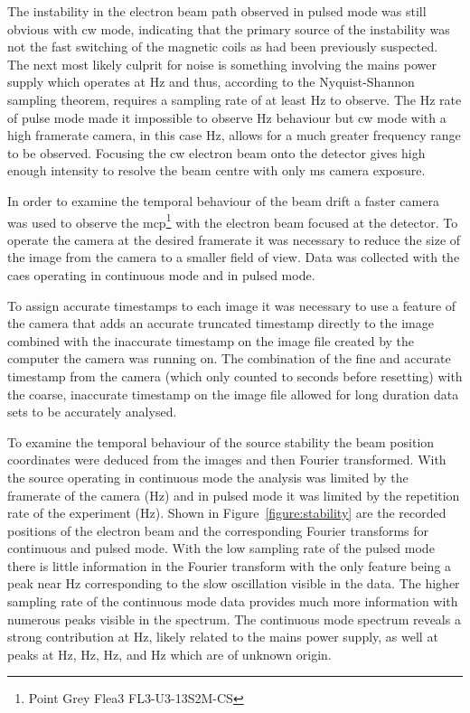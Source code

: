 The instability in the electron beam path observed in pulsed mode was still obvious with \gls{cw} mode, indicating that the primary source of the instability was not the fast switching of the magnetic coils as had been previously suspected.
The next most likely culprit for noise is something involving the mains power supply which operates at \unit[50]{Hz} and thus, according to the Nyquist-Shannon sampling theorem, requires a sampling rate of at least \unit[100]{Hz} to observe.
The \unit[10]{Hz} rate of pulse mode made it impossible to observe \unit[50]{Hz} behaviour but \gls{cw} mode with a high framerate camera, in this case \unit[240]{Hz}, allows for a much greater frequency range to be observed.
Focusing the \gls{cw} electron beam onto the detector gives high enough intensity to resolve the beam centre with only \unit[4]{ms} camera exposure.

In order to examine the temporal behaviour of the beam drift a faster camera was used to observe the \gls{mcp}\footnote{Point Grey Flea3 FL3-U3-13S2M-CS} with the electron beam focused at the detector.
To operate the camera at the desired framerate it was necessary to reduce the size of the image from the camera to a smaller field of view.
Data was collected with the \gls{caes} operating in continuous mode and in pulsed mode.

To assign accurate timestamps to each image it was necessary to use a feature of the camera that adds an accurate truncated timestamp directly to the image combined with the inaccurate timestamp on the image file created by the computer the camera was running on.
The combination of the fine and accurate timestamp from the camera (which only counted to \unit[128]{seconds} before resetting) with the coarse, inaccurate timestamp on the image file allowed for long duration data sets to be accurately analysed.

To examine the temporal behaviour of the source stability the beam position coordinates were deduced from the images and then Fourier transformed.
With the source operating in continuous mode the analysis was limited by the framerate of the camera (\unit[240]{Hz}) and in pulsed mode it was limited by the repetition rate of the experiment (\unit[10]{Hz}).
Shown in Figure~\ref{figure:stability} are the recorded positions of the electron beam and the corresponding Fourier transforms for continuous and pulsed mode.
With the low sampling rate of the pulsed mode there is little information in the Fourier transform with the only feature being a peak near \unit[0]{Hz} corresponding to the slow oscillation visible in the data.
The higher sampling rate of the continuous mode data provides much more information with numerous peaks visible in the spectrum.
The continuous mode spectrum reveals a strong contribution at \unit[50]{Hz}, likely related to the mains power supply, as well at peaks at \unit[45]{Hz}, \unit[67]{Hz}, \unit[84]{Hz}, and \unit[92]{Hz} which are of unknown origin.

